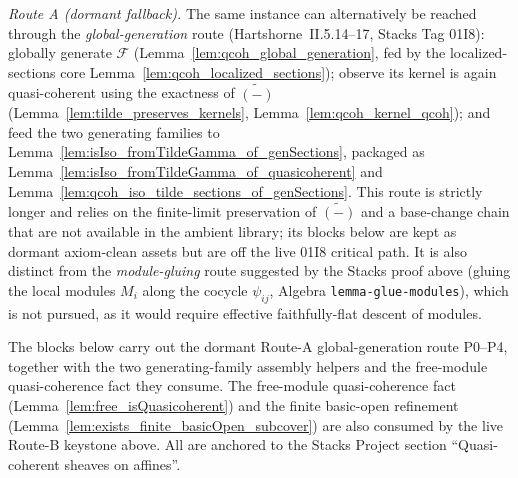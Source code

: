 \begin{remark}
  \emph{Route A (dormant fallback).} The same instance can alternatively be reached through the
  \emph{global-generation} route (Hartshorne~II.5.14--17, Stacks Tag 01I8): globally generate
  \(\mathcal{F}\) (Lemma~\ref{lem:qcoh_global_generation}, fed by the localized-sections core
  Lemma~\ref{lem:qcoh_localized_sections}); observe its kernel is again quasi-coherent using the
  exactness of \(\widetilde{(-)}\) (Lemma~\ref{lem:tilde_preserves_kernels},
  Lemma~\ref{lem:qcoh_kernel_qcoh}); and feed the two generating families to
  Lemma~\ref{lem:isIso_fromTildeGamma_of_genSections}, packaged as
  Lemma~\ref{lem:isIso_fromTildeGamma_of_quasicoherent} and
  Lemma~\ref{lem:qcoh_iso_tilde_sections_of_genSections}. This route is strictly longer and relies on
  the finite-limit preservation of \(\widetilde{(-)}\) and a base-change chain that are not available
  in the ambient library; its blocks below are kept as dormant axiom-clean assets but are off the
  live 01I8 critical path. It is also distinct from the
  \emph{module-gluing} route suggested by the Stacks proof above (gluing the local modules \(M_i\)
  along the cocycle \(\psi_{ij}\), Algebra \texttt{lemma-glue-modules}), which is not pursued, as it
  would require effective faithfully-flat descent of modules.
\end{remark}

The blocks below carry out the dormant Route-A global-generation route P0--P4, together with the
two generating-family assembly helpers and the free-module quasi-coherence fact they consume. The
free-module quasi-coherence fact (Lemma~\ref{lem:free_isQuasicoherent}) and the finite basic-open
refinement (Lemma~\ref{lem:exists_finite_basicOpen_subcover}) are also consumed by the live Route-B
keystone above. All are anchored to the Stacks Project section ``Quasi-coherent sheaves on affines''.

